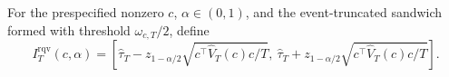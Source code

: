 For the prespecified nonzero \(c\), \(\alpha\in(0,1)\), and the event-truncated sandwich formed with threshold \(\omega_{c,T}/2\), define
\[
 I_T^{\mathrm{rqv}}(c,\alpha)=
 \left[\widehat\tau_T-z_{1-\alpha/2}
 \sqrt{c^\top\widehat V_T(c)c/T},\ 
 \widehat\tau_T+z_{1-\alpha/2}
 \sqrt{c^\top\widehat V_T(c)c/T}\right].
\]